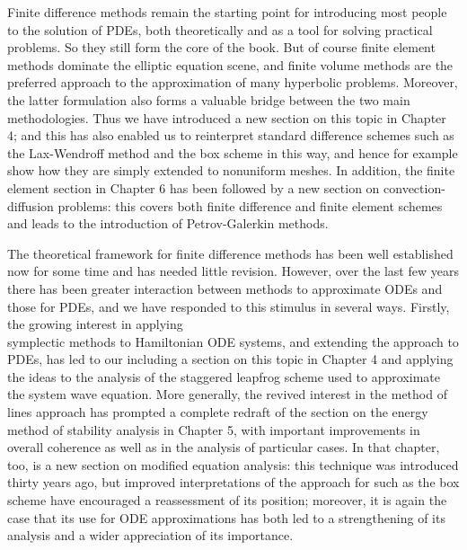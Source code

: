 \documentclass[10pt]{article}
\begin{document}
Finite difference methods remain the starting point for introducing most people to the solution of PDEs, both theoretically and as a tool for solving practical problems. So they still form the core of the book. But of course finite element methods dominate the elliptic equation scene, and finite volume methods are the preferred approach to the approximation of many hyperbolic problems. Moreover, the latter formulation also forms a valuable bridge between the two main methodologies. Thus we have introduced a new section on this topic in Chapter 4; and this has also enabled us to reinterpret standard difference schemes such as the Lax-Wendroff method and the box scheme in this way, and hence for example show how they are simply extended to nonuniform meshes. In addition, the finite element section in Chapter 6 has been followed by a new section on convection-diffusion problems: this covers both finite difference and finite element schemes and leads to the introduction of Petrov-Galerkin methods.

The theoretical framework for finite difference methods has been well established now for some time and has needed little revision. However, over the last few years there has been greater interaction between methods to approximate ODEs and those for PDEs, and we have responded to this stimulus in several ways. Firstly, the growing interest in applying\\
symplectic methods to Hamiltonian ODE systems, and extending the approach to PDEs, has led to our including a section on this topic in Chapter 4 and applying the ideas to the analysis of the staggered leapfrog scheme used to approximate the system wave equation. More generally, the revived interest in the method of lines approach has prompted a complete redraft of the section on the energy method of stability analysis in Chapter 5, with important improvements in overall coherence as well as in the analysis of particular cases. In that chapter, too, is a new section on modified equation analysis: this technique was introduced thirty years ago, but improved interpretations of the approach for such as the box scheme have encouraged a reassessment of its position; moreover, it is again the case that its use for ODE approximations has both led to a strengthening of its analysis and a wider appreciation of its importance.
\end{document}
